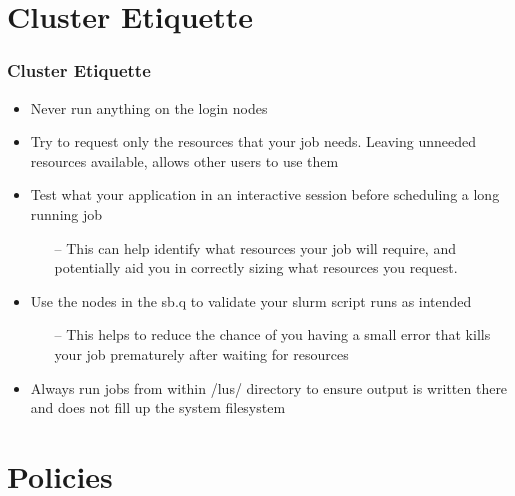 \documentclass[t,hyperref={pdfpagelabels=false}]{beamer}
\newcommand{\ctilde}{{\fontfamily{ptm}\selectfont\texttildelow}}
\begin{document}
\section{Cluster Etiquette}
\begin{frame}
\frametitle{Cluster Etiquette}
\begin{itemize}
\item Never run anything on the login nodes
\item Try to request only the resources that your job needs.  Leaving unneeded resources available, allows other users to use them
\item Test what your application in an interactive session before scheduling a long running job
\begin{itemize}
\item[--] This can help identify what resources your job will require, and potentially aid you in correctly sizing what resources you request.
\end{itemize}
\item Use the nodes in the sb.q to validate your slurm script runs as intended
\begin{itemize}
\item[--] This helps to reduce the chance of you having a small error that kills your job prematurely after waiting for resources 
\end{itemize} 
\item Always run jobs from within {\ctilde}/lus/ directory to ensure output is written there and does not fill up the system filesystem
\end{itemize}
\end{frame}



\section{Policies}
\end{document}
